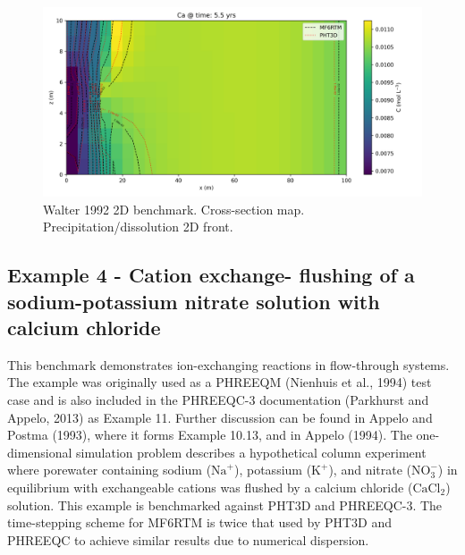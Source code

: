 \documentclass{article}
\begin{document}
\begin{figure}[H]
\centering

    \includegraphics[width=\linewidth]{figures/ex3_Ca_2000.png}
\caption{Walter 1992 2D benchmark. Cross-section map. Precipitation/dissolution 2D front.}
\label{fig:ex3_2}
\end{figure}

\subsection{Example 4 - Cation exchange- flushing of a sodium-potassium nitrate solution with calcium chloride}
This benchmark demonstrates ion-exchanging reactions in flow-through systems. The example was originally used as a PHREEQM (Nienhuis et al., 1994) test case and is also included in the PHREEQC-3 documentation (Parkhurst and Appelo, 2013) as Example 11. Further discussion can be found in Appelo and Postma (1993), where it forms Example 10.13, and in Appelo (1994). The one-dimensional simulation problem describes a hypothetical column experiment where porewater containing sodium (\(\text{Na}^+\)), potassium (\(\text{K}^+\)), and nitrate (\(\text{NO}_3^-\)) in equilibrium with exchangeable cations was flushed by a calcium chloride (\(\text{CaCl}_2\)) solution. This example is benchmarked against PHT3D and PHREEQC-3. The time-stepping scheme for MF6RTM is twice that used by PHT3D and PHREEQC to achieve similar results due to numerical dispersion.
\end{document}
